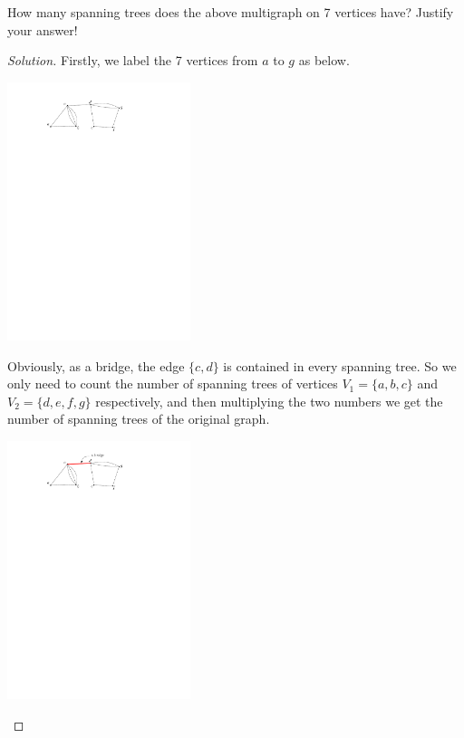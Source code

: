     \begin{thm}{}{}
        How many spanning trees does the above multigraph on 7 vertices have? Justify your answer!
    \end{thm}

    \begin{proof}[Solution]
        Firstly, we label the 7 vertices from $a$ to $g$ as below.
        \begin{center}
            \includegraphics[width=0.4\textwidth]{figures/multigraph-labeled.pdf}
        \end{center}
    
        Obviously, as a bridge, the edge $\{c, d\}$ is contained in every spanning tree. So we only need to count the number of spanning trees of vertices $V_1 = \{a, b, c\}$ and $V_2 = \{d, e , f, g\}$ respectively, and then multiplying the two numbers we get the number of spanning trees of the original graph.
        \begin{center}
            \includegraphics[width=0.4\textwidth]{figures/multigraph-bridge.pdf}
        \end{center}
        

\end{proof}

